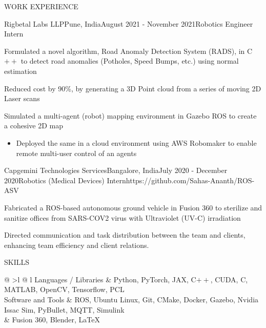 \documentclass{resume} %
\begin{document}
\begin{rSection}{WORK EXPERIENCE}
	\begin{rProjExpDetails}{Rigbetal Labs LLP}{Pune, India}{August 2021 - November 2021}{Robotics Engineer Intern}{}{}
		\item Formulated a novel algorithm, Road Anomaly Detection System (RADS), in C$++$ to detect road anomalies (Potholes, Speed Bumps, etc.) using normal estimation
		\item Reduced cost by 90\%, by generating a 3D Point cloud from a series of moving 2D Laser scans
		\item Simulated a multi-agent (robot) mapping environment in Gazebo ROS to create a cohesive 2D map
		\begin{itemize}
			\item Deployed the same in a cloud environment using AWS Robomaker to enable remote multi-user control of an agents
		\end{itemize}
	\end{rProjExpDetails}

	\begin{rProjExpDetails}{Capgemini Technologies Services}{Bangalore, India}{July 2020 - December 2020}{Robotics (Medical Devices) Intern}{https://github.com/Sahas-Ananth/ROS-ASV}{}
		\item Fabricated a ROS-based autonomous ground vehicle in Fusion 360 to sterilize and sanitize offices from SARS-COV2 virus with Ultraviolet (UV-C) irradiation
		\item Directed communication and task distribution between the team and clients, enhancing team efficiency and client relations.
	\end{rProjExpDetails}
\end{rSection}
\begin{rSection}{SKILLS}
	\begin{tabular}{ @ {} >{\bfseries}l @{\hspace{3ex}} l }
		Languages / Libraries & Python, PyTorch, JAX, C$++$, CUDA, C, MATLAB, OpenCV, Tensorflow, PCL                     \\
		Software and Tools    & ROS, Ubuntu Linux, Git, CMake, Docker, Gazebo, Nvidia Issac Sim, PyBullet, MQTT, Simulink \\
		                      & Fusion 360, Blender, LaTeX                                                                \\
	\end{tabular}
\end{rSection}
\vspace{-3.0mm}
\end{document}
